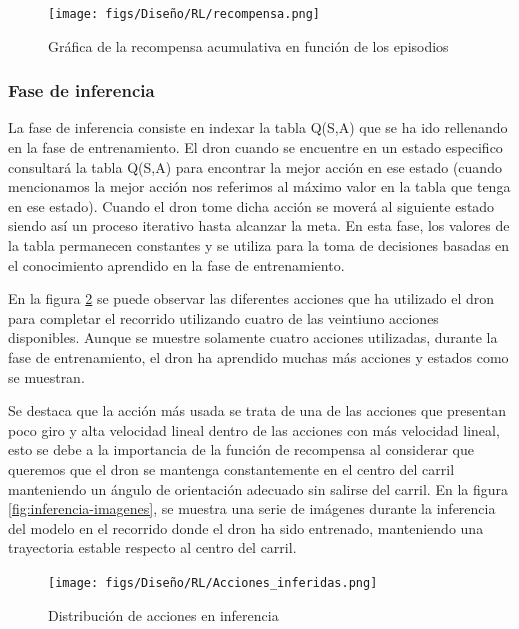 \begin{figure} [H]
  \begin{center}
    \texttt{[image: figs/Diseño/RL/recompensa.png]}
  \end{center}
  \caption{Gráfica de la recompensa acumulativa en función de los episodios}
  \label{fig:recompensa}
  \vspace{-1.5em}
\end{figure}

\subsubsection{Fase de inferencia}
\label{sec:fases_inferencia}
La fase de inferencia consiste en indexar la tabla Q(S,A) que se ha ido rellenando en la fase de entrenamiento. El dron cuando se encuentre en un estado especifico consultará la tabla Q(S,A) para
encontrar la mejor acción en ese estado (cuando mencionamos la mejor acción nos referimos al máximo valor en la tabla que tenga en ese estado). Cuando el dron tome dicha acción se moverá al siguiente estado
siendo así un proceso iterativo hasta alcanzar la meta. En esta fase, los valores de la tabla permanecen constantes y se utiliza para la toma de decisiones basadas en el conocimiento
aprendido en la fase de entrenamiento.

En la figura \ref{fig:Distribucción_inferencia} se puede observar las diferentes acciones que ha utilizado el dron para completar el recorrido utilizando cuatro de las veintiuno acciones
disponibles. Aunque se muestre solamente cuatro acciones utilizadas, durante la fase de entrenamiento, el dron ha aprendido muchas más acciones y estados como se muestran. 

Se destaca que la acción más usada se trata de una de las acciones que presentan poco giro y alta velocidad lineal dentro de las acciones con más velocidad lineal, esto se debe
a la importancia de la función de recompensa al considerar que queremos que el dron se mantenga constantemente en el centro del carril manteniendo un ángulo de orientación adecuado
sin salirse del carril. En la figura \ref{fig:inferencia-imagenes}, se muestra una serie de imágenes durante la inferencia del modelo en el recorrido donde el dron ha sido entrenado, manteniendo una trayectoria 
estable respecto al centro del carril.

\begin{figure} [H]
  \begin{center}
    \texttt{[image: figs/Diseño/RL/Acciones\_inferidas.png]}
  \end{center}
  \caption{Distribución de acciones en inferencia}
  \label{fig:Distribucción_inferencia}
\end{figure}

